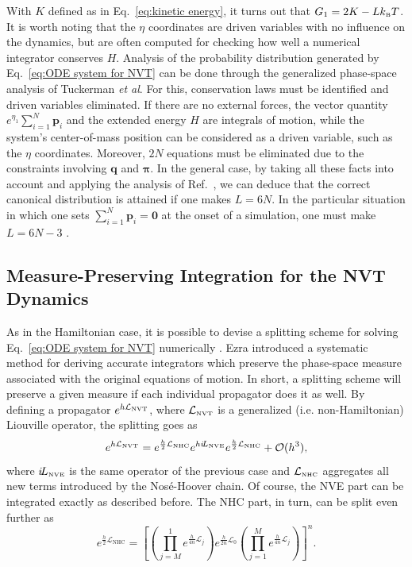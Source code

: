 \documentclass[
journal=jctcce,
layout=twocolumn
]{achemso}
\newcommand{\vt}[1]{\boldsymbol{\mathbf{#1}}}   %
\newcommand{\Liu}[1]{i\!L_\text{#1}}            %
\newcommand{\timestep}{h}
\begin{document}
With $K$ defined as in Eq.~\eqref{eq:kinetic energy}, it turns out that $G_1 = 2K - L k_\text{\tiny B} T$.
It is worth noting that the $\eta$ coordinates are driven variables with no influence on the dynamics, but are often computed for checking how well a numerical integrator conserves $H$.
Analysis of the probability distribution generated by Eq.~\eqref{eq:ODE system for NVT} can be done through the generalized phase-space analysis of Tuckerman \textit{et al}.\cite{Tuckerman_2001} For this, conservation laws must be identified and driven variables eliminated.
If there are no external forces, the vector quantity $e^{\eta_1}\sum_{i=1}^N {\vt p}_i$ and the extended energy $H$ are integrals of motion, while the system's center-of-mass position can be considered as a driven variable,\cite{Tuckerman_2001} such as the $\eta$ coordinates.
Moreover, $2N$ equations must be eliminated due to the constraints involving $\vt q$ and $\vt \pi$.
In the general case, by taking all these facts into account and applying the analysis of Ref.~, we can deduce that the correct canonical distribution is attained if one makes $L = 6N$.
In the particular situation in which one sets $\sum_{i=1}^N {\vt p}_i = \vt 0$ at the onset of a simulation, one must make $L = 6N - 3$ \cite{Martyna_1994}.

\subsection{Measure-Preserving Integration for the NVT Dynamics}

As in the Hamiltonian case, it is possible to devise a splitting scheme for solving Eq.~\eqref{eq:ODE system for NVT} numerically \cite{Tuckerman_2010}.
Ezra \cite{Ezra_2006} introduced a systematic method for deriving accurate integrators which preserve the phase-space measure associated with the original equations of motion.
In short, a splitting scheme will preserve a given measure if each individual propagator does it as well.
By defining a propagator $e^{\timestep \mathcal{L}_\text{\tiny NVT}}$, where $\mathcal{L}_\text{\tiny NVT}$ is a generalized (i.e.
non-Hamiltonian) Liouville operator, the splitting goes as
\begin{equation}
\label{eq:splitting NVT}
e^{\timestep \mathcal{L}_\text{\tiny NVT}} = e^{\frac{\timestep}{2} \mathcal{L}_\text{\tiny NHC}} e^{\timestep \Liu{\tiny NVE}} e^{\frac{\timestep}{2} \mathcal{L}_\text{\tiny NHC}} + \mathcal{O}(\timestep^3),
\end{equation}
where $\Liu{\tiny NVE}$ is the same operator of the previous case and $\mathcal{L}_\text{\tiny NHC}$ aggregates all new terms introduced by the Nos\'e-Hoover chain.
Of course, the NVE part can be integrated exactly as described before.
The NHC part, in turn, can be split even further as
\begin{equation*}
e^{\frac{\timestep}{2} \mathcal{L}_\text{NHC}} = \left[ \left( \textstyle\prod\limits_{j=M}^1 e^{\frac{\timestep}{4n} \mathcal{L}_j }\right) e^{\frac{\timestep}{2n} \mathcal{L}_0 } \left(  \textstyle\prod\limits_{j=1}^M e^{\frac{\timestep}{4n} \mathcal{L}_j }\right)  \right]^n.
\end{equation*}
\end{document}
